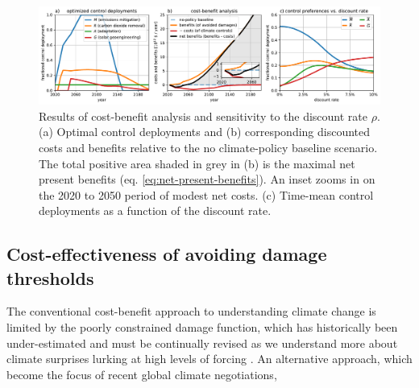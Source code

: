 \documentclass[9pt,twocolumn,twoside,lineno]{pnas-new}
\begin{document}
\begin{figure}%
\centering
\includegraphics[width=17.8cm]{figures/default-benefits_controls_and_benefits.pdf}
\caption{Results of cost-benefit analysis and sensitivity to the discount rate $\rho$. (a) Optimal control deployments and (b) corresponding discounted costs and benefits relative to the no climate-policy baseline scenario. The total positive area shaded in grey in (b) is the maximal net present benefits (eq. \ref{eq:net-present-benefits}). An inset zooms in on the 2020 to 2050 period of modest net costs. (c) Time-mean control deployments as a function of the discount rate.}
\label{fig:cost-benefit}
\end{figure}

\subsection*{Cost-effectiveness of avoiding damage thresholds}\label{sec:cost-effectivness}

The conventional cost-benefit approach to understanding climate change is limited by the poorly constrained damage function, which has historically been under-estimated \cite{} and must be continually revised as we understand more about climate surprises lurking at high levels of forcing \citep{alley_abrupt_2003, sherwood_adaptability_2010, }. An alternative approach, which  become the focus of recent global climate negotiations,
\end{document}
